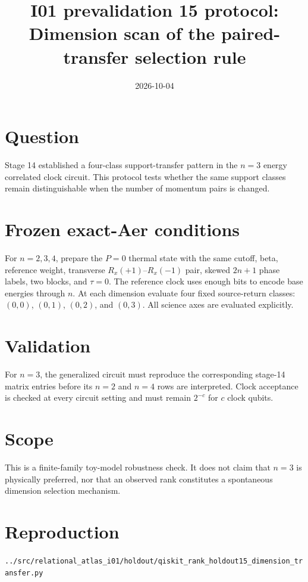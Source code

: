 \documentclass[11pt]{article}
\begin{document}
\title{I01 prevalidation 15 protocol:\\Dimension scan of the paired-transfer selection rule}
\date{2026-10-04}
\maketitle

\section*{Question}
Stage 14 established a four-class support-transfer pattern in the $n=3$ energy
correlated clock circuit. This protocol tests whether the same support classes remain
distinguishable when the number of momentum pairs is changed.

\section*{Frozen exact-Aer conditions}
For $n=2,3,4$, prepare the $P=0$ thermal state with the same cutoff, beta, reference
weight, transverse $R_x(+1)$--$R_x(-1)$ pair, skewed $2n+1$ phase labels, two blocks,
and $\tau=0$. The reference clock uses enough bits to encode base energies through
$n$. At each dimension evaluate four fixed source-return classes: $(0,0)$, $(0,1)$,
$(0,2)$, and $(0,3)$. All science axes are evaluated explicitly.

\section*{Validation}
For $n=3$, the generalized circuit must reproduce the corresponding stage-14 matrix
entries before its $n=2$ and $n=4$ rows are interpreted. Clock acceptance is checked
at every circuit setting and must remain $2^{-c}$ for $c$ clock qubits.

\section*{Scope}
This is a finite-family toy-model robustness check. It does not claim that $n=3$ is
physically preferred, nor that an observed rank constitutes a spontaneous dimension
selection mechanism.

\section*{Reproduction}
\texttt{../src/relational\_atlas\_i01/holdout/qiskit\_rank\_holdout15\_dimension\_transfer.py}
\end{document}
